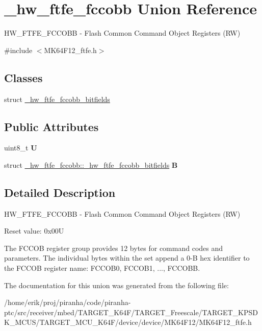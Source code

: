\hypertarget{union__hw__ftfe__fccobb}{}\section{\+\_\+hw\+\_\+ftfe\+\_\+fccobb Union Reference}
\label{union__hw__ftfe__fccobb}


H\+W\+\_\+\+F\+T\+F\+E\+\_\+\+F\+C\+C\+O\+BB -\/ Flash Common Command Object Registers (RW)  




{\ttfamily \#include $<$M\+K64\+F12\+\_\+ftfe.\+h$>$}

\subsection*{Classes}
\begin{DoxyCompactItemize}
\item 
struct \hyperlink{struct__hw__ftfe__fccobb_1_1__hw__ftfe__fccobb__bitfields}{\+\_\+hw\+\_\+ftfe\+\_\+fccobb\+\_\+bitfields}
\end{DoxyCompactItemize}
\subsection*{Public Attributes}
\begin{DoxyCompactItemize}
\item 
uint8\+\_\+t {\bfseries U}\hypertarget{union__hw__ftfe__fccobb_a38747dcb334ec89c50abddef59b92347}{}\label{union__hw__ftfe__fccobb_a38747dcb334ec89c50abddef59b92347}

\item 
struct \hyperlink{struct__hw__ftfe__fccobb_1_1__hw__ftfe__fccobb__bitfields}{\+\_\+hw\+\_\+ftfe\+\_\+fccobb\+::\+\_\+hw\+\_\+ftfe\+\_\+fccobb\+\_\+bitfields} {\bfseries B}\hypertarget{union__hw__ftfe__fccobb_a273eb341bb0707a50151a7855f839730}{}\label{union__hw__ftfe__fccobb_a273eb341bb0707a50151a7855f839730}

\end{DoxyCompactItemize}


\subsection{Detailed Description}
H\+W\+\_\+\+F\+T\+F\+E\+\_\+\+F\+C\+C\+O\+BB -\/ Flash Common Command Object Registers (RW) 

Reset value\+: 0x00U

The F\+C\+C\+OB register group provides 12 bytes for command codes and parameters. The individual bytes within the set append a 0-\/B hex identifier to the F\+C\+C\+OB register name\+: F\+C\+C\+O\+B0, F\+C\+C\+O\+B1, ..., F\+C\+C\+O\+BB. 

The documentation for this union was generated from the following file\+:\begin{DoxyCompactItemize}
\item 
/home/erik/proj/piranha/code/piranha-\/ptc/src/receiver/mbed/\+T\+A\+R\+G\+E\+T\+\_\+\+K64\+F/\+T\+A\+R\+G\+E\+T\+\_\+\+Freescale/\+T\+A\+R\+G\+E\+T\+\_\+\+K\+P\+S\+D\+K\+\_\+\+M\+C\+U\+S/\+T\+A\+R\+G\+E\+T\+\_\+\+M\+C\+U\+\_\+\+K64\+F/device/device/\+M\+K64\+F12/M\+K64\+F12\+\_\+ftfe.\+h\end{DoxyCompactItemize}
